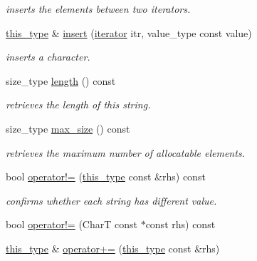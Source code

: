 \begin{DoxyCompactItemize}
\begin{DoxyCompactList}\small\item\em inserts the elements between two iterators. \end{DoxyCompactList}\item 
\hypertarget{classhryky_1_1_string_a62f0f7325194c1c86dfbd6af80605b90}{\hyperlink{classhryky_1_1_string}{this\-\_\-type} \& \hyperlink{classhryky_1_1_string_a62f0f7325194c1c86dfbd6af80605b90}{insert} (\hyperlink{classhryky_1_1iterator_1_1random_1_1_mutable}{iterator} itr, value\-\_\-type const value)}\label{classhryky_1_1_string_a62f0f7325194c1c86dfbd6af80605b90}

\begin{DoxyCompactList}\small\item\em inserts a character. \end{DoxyCompactList}\item 
\hypertarget{classhryky_1_1_string_a908a0c14b8c8af6123da3508f3e5d1ce}{size\-\_\-type \hyperlink{classhryky_1_1_string_a908a0c14b8c8af6123da3508f3e5d1ce}{length} () const }\label{classhryky_1_1_string_a908a0c14b8c8af6123da3508f3e5d1ce}

\begin{DoxyCompactList}\small\item\em retrieves the length of this string. \end{DoxyCompactList}\item 
\hypertarget{classhryky_1_1_string_aafb6d82457bc1b598e6fb60dee15d562}{size\-\_\-type \hyperlink{classhryky_1_1_string_aafb6d82457bc1b598e6fb60dee15d562}{max\-\_\-size} () const }\label{classhryky_1_1_string_aafb6d82457bc1b598e6fb60dee15d562}

\begin{DoxyCompactList}\small\item\em retrieves the maximum number of allocatable elements. \end{DoxyCompactList}\item 
\hypertarget{classhryky_1_1_string_aab264bc0bc8f1a6c43d44dfe5ccb2b4f}{bool \hyperlink{classhryky_1_1_string_aab264bc0bc8f1a6c43d44dfe5ccb2b4f}{operator!=} (\hyperlink{classhryky_1_1_string}{this\-\_\-type} const \&rhs) const }\label{classhryky_1_1_string_aab264bc0bc8f1a6c43d44dfe5ccb2b4f}

\begin{DoxyCompactList}\small\item\em confirms whether each string has different value. \end{DoxyCompactList}\item 
bool \hyperlink{classhryky_1_1_string_a5275fd7f49fe5ee0e36e06b9caf37295}{operator!=} (Char\-T const $\ast$const rhs) const 
\item 
\hypertarget{classhryky_1_1_string_a96d9ab83efd313311b3dc6f659b16027}{\hyperlink{classhryky_1_1_string}{this\-\_\-type} \& \hyperlink{classhryky_1_1_string_a96d9ab83efd313311b3dc6f659b16027}{operator+=} (\hyperlink{classhryky_1_1_string}{this\-\_\-type} const \&rhs)}\label{classhryky_1_1_string_a96d9ab83efd313311b3dc6f659b16027}


\end{DoxyCompactItemize}
